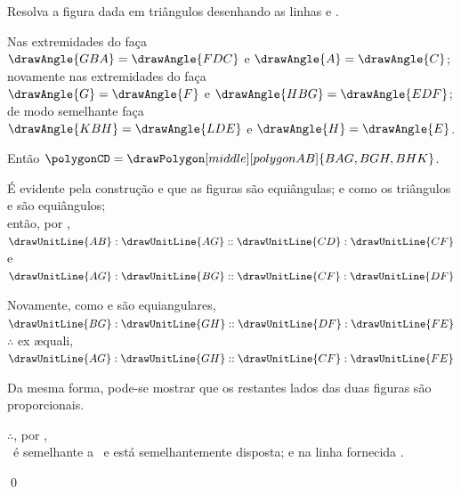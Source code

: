 \documentclass[booklanguage=brazilian]{byrnebook}
\begin{document}
\begin{center}
Resolva a figura dada em triângulos desenhando as linhas  e .

Nas extremidades do  faça\\
$\drawAngle{GBA} = \drawAngle{FDC}$ e $\drawAngle{A} = \drawAngle{C}$;\\
novamente nas extremidades do  faça\\
$\drawAngle{G} = \drawAngle{F}$ e $\drawAngle{HBG} = \drawAngle{EDF}$;\\
de modo semelhante faça\\
$\drawAngle{KBH} = \drawAngle{LDE}$ e $\drawAngle{H} = \drawAngle{E}$.

Então $\polygonCD = \drawPolygon[middle][polygonAB]{BAG,BGH,BHK}$.

É evidente pela construção e  que as figuras são equiângulas; e como os triângulos  e  são equiângulos;\\
então, por ,
$\drawUnitLine{AB}:\drawUnitLine{AG} :: \drawUnitLine{CD} : \drawUnitLine{CF}$\\
e $\drawUnitLine{AG}:\drawUnitLine{BG} :: \drawUnitLine{CF} : \drawUnitLine{DF}$

Novamente, como  e  são equiangulares,\\
$\drawUnitLine{BG}:\drawUnitLine{GH} :: \drawUnitLine{DF} : \drawUnitLine{FE}$\\
$\therefore$ ex \ae quali,\\
$\drawUnitLine{AG}:\drawUnitLine{GH} :: \drawUnitLine{CF} : \drawUnitLine{FE}$  %

Da mesma forma, pode-se mostrar que os restantes lados das duas figuras são proporcionais.

$\therefore$, por ,\\
\polygonAB\ é semelhante a \polygonCD\ e está semelhantemente disposta; e na linha fornecida .
\end{center}

\qed
\end{document}
